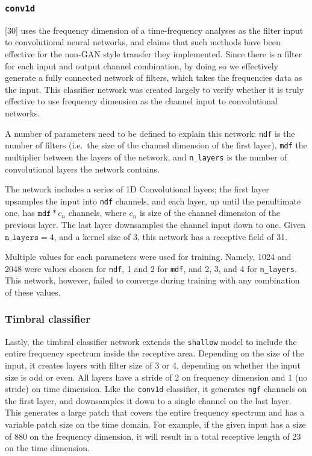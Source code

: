 \documentclass[12pt,a4paper,]{report}
\begin{document}
\hypertarget{conv1d}{%
\subsubsection{\texorpdfstring{\texttt{conv1d}}{conv1d}}\label{conv1d}}

{[}30{]} uses the frequency dimension of a time-frequency analyses as
the filter input to convolutional neural networks, and claims that such
methods have been effective for the non-GAN style transfer they
implemented. Since there is a filter for each input and output channel
combination, by doing so we effectively generate a fully connected
network of filters, which takes the frequencies data as the input. This
classifier network was created largely to verify whether it is truly
effective to use frequency dimension as the channel input to
convolutional networks.

A number of parameters need to be defined to explain this network:
\texttt{ndf} is the number of filters (i.e.~the size of the channel
dimension of the first layer), \texttt{mdf} the multiplier between the
layers of the network, and \texttt{n\_layers} is the number of
convolutional layers the network contains.

The network includes a series of 1D Convolutional layers; the first
layer upsamples the input into \texttt{ndf} channels, and each layer, up
until the penultimate one, has \(\texttt{mdf} * c_n\) channels, where
\(c_n\) is size of the channel dimension of the previous layer. The last
layer downsamples the channel input down to one. Given
\(\texttt{n\_layers} = 4\), and a kernel size of 3, this network has a
receptive field of 31.

Multiple values for each parameters were used for training. Namely, 1024
and 2048 were values chosen for \texttt{ndf}, 1 and 2 for \texttt{mdf},
and 2, 3, and 4 for \texttt{n\_layers}. This network, however, failed to
converge during training with any combination of these values.

\hypertarget{timbral-classifier}{%
\subsubsection{Timbral classifier}\label{timbral-classifier}}

Lastly, the timbral classifier network extends the \texttt{shallow}
model to include the entire frequency spectrum inside the receptive
area. Depending on the size of the input, it creates layers with filter
size of 3 or 4, depending on whether the input size is odd or even. All
layers have a stride of 2 on frequency dimension and 1 (no stride) on
time dimension. Like the \texttt{conv1d} classifier, it generates
\texttt{ngf} channels on the first layer, and downsamples it down to a
single channel on the last layer. This generates a large patch that
covers the entire frequency spectrum and has a variable patch size on
the time domain. For example, if the given input has a size of 880 on
the frequency dimension, it will result in a total receptive length of
23 on the time dimension.
\end{document}
